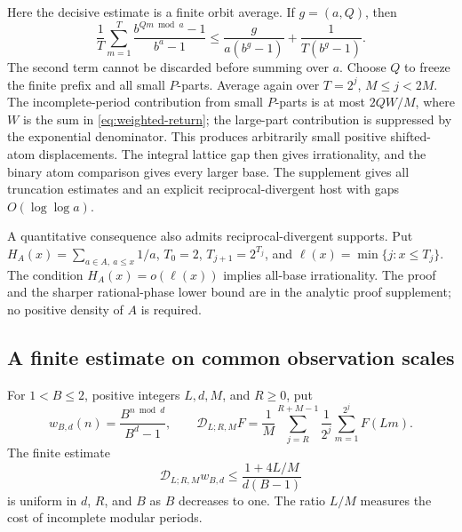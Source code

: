 \documentclass[11pt]{article}
\begin{document}
Here the decisive estimate is a finite orbit average.  If $g=(a,Q)$, then
\[
 \frac1T\sum_{m=1}^T
 \frac{b^{Qm\bmod a}-1}{b^a-1}
 \le \frac{g}{a(b^g-1)}+\frac1{T(b^g-1)}.
\]
The second term cannot be discarded before summing over $a$.  Choose $Q$
to freeze the finite prefix and all small $P$-parts.  Average again over
$T=2^j$, $M\le j<2M$.  The incomplete-period contribution from small
$P$-parts is at most $2QW/M$, where $W$ is the sum in
\eqref{eq:weighted-return}; the large-part contribution is suppressed by
the exponential denominator.  This produces arbitrarily small positive
shifted-atom displacements.  The integral lattice gap then gives
irrationality, and the binary atom comparison gives every larger base.
The supplement gives all truncation estimates and an explicit
reciprocal-divergent host with gaps $O(\log\log a)$.

A quantitative consequence also admits reciprocal-divergent supports.
Put $H_A(x)=\sum_{a\in A,\ a\le x}1/a$, $T_0=2$, $T_{j+1}=2^{T_j}$,
and $\ell(x)=\min\{j:x\le T_j\}$.  The condition
$H_A(x)=o(\ell(x))$ implies all-base irrationality.  The proof and the
sharper rational-phase lower bound are in the analytic proof supplement;
no positive density of $A$ is required.

\subsection{A finite estimate on common observation scales}\label{sec:common-kernel}
For $1<B\le2$, positive integers $L,d,M$, and $R\ge0$, put
\[
 w_{B,d}(n)=\frac{B^{n\bmod d}}{B^d-1},\qquad
 \mathscr D_{L;R,M}F
 =\frac1M\sum_{j=R}^{R+M-1}\frac1{2^j}
      \sum_{m=1}^{2^j}F(Lm).
\]
The finite estimate
\[
 \mathscr D_{L;R,M}w_{B,d}
 \le\frac{1+4L/M}{d(B-1)}
 \label{eq:mixed-finite-kernel}\tag{S}
\]
is uniform in $d$, $R$, and $B$ as $B$ decreases to one.
The ratio $L/M$ measures the cost of incomplete modular periods.
\end{document}

